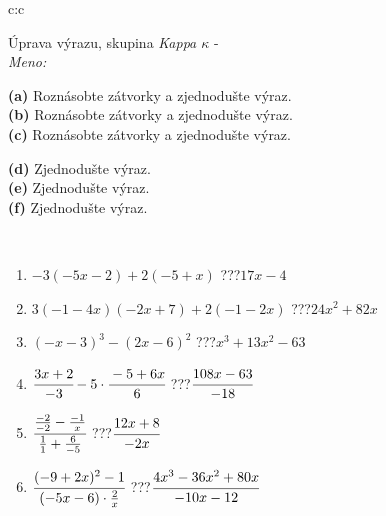 \documentclass[10pt]{report}
\begin{document}
\newpage
\thispagestyle{empty}
\begin{tabular}{c:c}
\begin{minipage}[c][104.5mm][t]{0.5\linewidth}
\begin{center}
\vspace{7mm}
{\huge Úprava výrazu, skupina \textit{Kappa $\kappa$} -}\\[5mm]
\textit{Meno:}\phantom{xxxxxxxxxxxxxxxxxxxxxxxxxxxxxxxxxxxxxxxxxxxxxxxxxxxxxxxxxxxxxxxxx}\\[5mm]
\begin{minipage}{0.95\linewidth}
\begin{center}
{\small \begin{minipage}{0.6\textwidth}
\textbf{(a)} Roznásobte zátvorky a zjednodušte výraz. \\[1mm]
\textbf{(b)} Roznásobte zátvorky a zjednodušte výraz. \\[1mm]
\textbf{(c)} Roznásobte zátvorky a zjednodušte výraz.
\end{minipage} \begin{minipage}{0.39\textwidth}
\textbf{(d)} Zjednodušte výraz. \\[1mm]
\textbf{(e)} Zjednodušte výraz. \\[1mm]
\textbf{(f)} Zjednodušte výraz.
\end{minipage}
}
\end{center}
\end{minipage}
\\[4mm]
\begin{minipage}{0.79\linewidth}
\begin{center}
\begin{varwidth}{\linewidth}
\begin{enumerate}
\normalsize
\item $-3(-5x-2)+2(-5+x)$\quad \dotfill\; ???\;\dotfill \quad $17x-4$
\item $3(-1-4x)(-2x+7)+2(-1-2x)$\quad \dotfill\; ???\;\dotfill \quad $24x^2+82x$
\item $(-x-3)^3-(2x-6)^2$\quad \dotfill\; ???\;\dotfill \quad $x^3+13x^2-63$
\item $\cfrac{3x+2}{-3}-5\cdot\cfrac{-5+6x}{6}$\quad \dotfill\; ???\;\dotfill \quad $\cfrac{108x-63}{-18}$
\item $\cfrac{\frac{-2}{-2}-\frac{-1}{x}}{\frac{1}{1}+\frac{6}{-5}}$\quad \dotfill\; ???\;\dotfill \quad $\cfrac{12x+8}{-2x}$
\item $\cfrac{(-9+2x)^2-1}{(-5x-6)\cdot\frac{2}{x}}$\quad \dotfill\; ???\;\dotfill \quad $\cfrac{4x^3-36x^2+80x}{-10x-12}$

\end{enumerate}
\end{varwidth}
\end{center}
\end{minipage}
\end{center}
\end{minipage}
\end{tabular}
\end{document}
